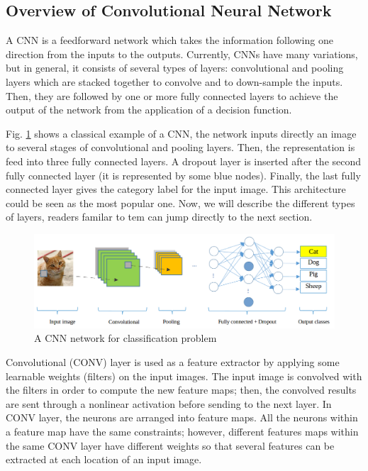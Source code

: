 \documentclass[review]{elsarticle}
\begin{document}
\subsection{Overview of Convolutional Neural Network}
A CNN is a feedforward network which takes the information following one direction from the inputs to the outputs. Currently, CNNs have many variations, but in general, it consists of several types of layers: convolutional and pooling layers which are stacked together to convolve and to down-sample the inputs. Then, they are followed by one or more fully connected layers to achieve the output of the network from the application of a decision function.

Fig. \ref{imgcnn_network} shows a classical example of a CNN, the network inputs directly an image to several stages of convolutional and pooling layers. Then, the representation is feed into three fully connected layers. A dropout layer is inserted after the second fully connected layer (it is represented by some blue nodes). Finally, the last fully connected layer gives the category label for the input image. This architecture could be seen as the most popular one. Now, we will describe the different types of layers, readers familar to tem can jump directly to the next section.

\begin{figure}[!h]
	\centering
	\includegraphics[scale=.3]{images/cnn_network_2}
	\caption{A CNN network for classification problem}
	\label{imgcnn_network}
\end{figure}

Convolutional (CONV) layer is used as a feature extractor by applying some learnable weights (filters) on the input images. The input image is convolved with the filters in order to compute the new feature maps; then, the convolved results are sent through a nonlinear activation before sending to the next layer. In CONV layer, the neurons are arranged into feature maps. All the neurons within a feature map have the same constraints; however, different features maps within the same CONV layer have different weights so that several features can be extracted at each location of an input image.
\end{document}
